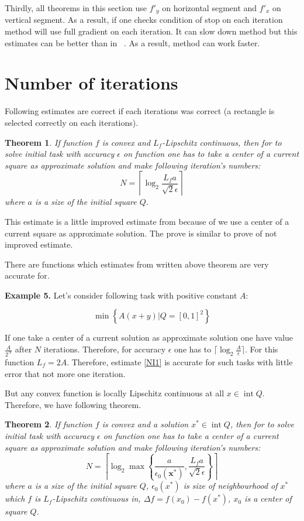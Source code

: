 \documentclass[12pt]{article}
\newtheorem{theorem}{Theorem}[section]
\DeclareMathOperator{\intt}{int}
\begin{document}
Thirdly, all theorems in this section use $f'_y$ on horizontal segment and $f'_x$ on vertical segment. As a result, if one checks condition of stop on each iteration method will use full gradient on each iteration. It can slow down method but this estimates can be better than in ~\cite{Ston_Pas}. As a result, method can work faster.

\section{Number of iterations}

Following estimates are correct if each iterations was correct (a rectangle is selected correctly on each iterations).

\begin{theorem}
If function $f$ is convex and $L_f$-Lipschitz continuous, then for to solve initial task with accuracy $\epsilon$ on function one has to take a center of a current square as approximate  solution and make following iteration's numbers:
\begin{equation}\label{NI1}N = \left\lceil\log_2\frac{L_fa}{\sqrt{2}\epsilon}\right\rceil\end{equation}
where $a$ is a size of the initial square $Q$.
\end{theorem}
This estimate is a little improved estimate from \cite{Ston_Pas} because of we use a center of a current square as approximate  solution. The prove is similar to prove of not improved estimate.

There are functions which estimates from written above theorem are very accurate for.

\textbf{Example 5.} Let's consider following task with positive constant $A$:

$$\min\left\{A(x+y)|Q = [0,1]^2\right\}$$

If one take a center of a current solution as approximate  solution one have value $\frac{A}{2^N}$ after $N$ iterations. Therefore, for accuracy $\epsilon$ one has to $\lceil\log_2\frac{A}{\epsilon}\rceil$. For this function $L_f = 2A$. Therefore, estimate \eqref{NI1} is accurate for such tasks with little error that not more one iteration.

But any convex function is locally Lipschitz continuous at all $x \in \intt Q$. Therefore, we have following theorem.

\begin{theorem}
If function $f$ is convex and a solution $x^*\in \intt Q$, then for to solve initial task with accuracy $\epsilon$ on function one has to take a center of a current square as approximate  solution and make following iteration's numbers:
\begin{equation}\label{NI2}
N = \left\lceil\log_2\max\left\{\frac{a}{\epsilon_0(\textbf{x}^*)},\frac{L_fa}{\sqrt{2}\epsilon}\right\}\right\rceil
\end{equation}
where $a$ is a size of the initial square $Q$, $\epsilon_0(x^*)$ is size of neighbourhood of $x^*$ which $f$ is $L_f$-Lipschitz continuous in, $\Delta f =  f(x_0) - f(x^*)$, $x_0$ is a center of square $Q$.
\end{theorem}
\end{document}
